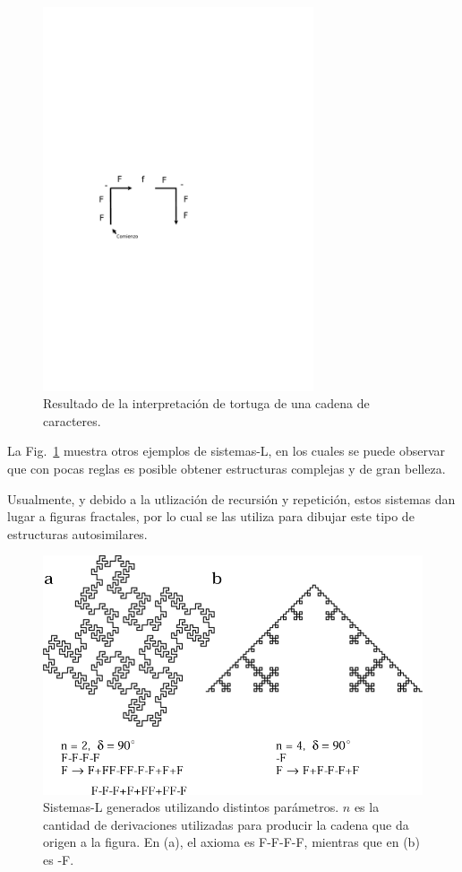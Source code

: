 \begin{figure}
\center
\includegraphics[width=8cm]{figures/tortuga}
\caption{Resultado de la interpretación de tortuga de una cadena de caracteres.}
\label{fg:tortuga}
\end{figure}

La Fig.~\ref{fg:tortuga} muestra otros ejemplos de sistemas-L, en los cuales se puede observar que con pocas reglas es posible obtener estructuras complejas y de gran belleza.

Usualmente, y debido a la utlización de recursión y repetición, estos sistemas dan lugar a figuras fractales, por lo cual se las utiliza para dibujar este tipo de estructuras autosimilares.

\begin{figure}
\center
\includegraphics[width=13cm]{figures/sistemasL}
\caption[Sistemas-L generados utilizando distintos parámetros]{Sistemas-L generados utilizando distintos parámetros. $n$ es la cantidad de derivaciones utilizadas para producir la cadena que da origen a la figura. En (a), el axioma es F-F-F-F, mientras que en (b) es -F.}
\label{fg:sistemasL}
\end{figure}

